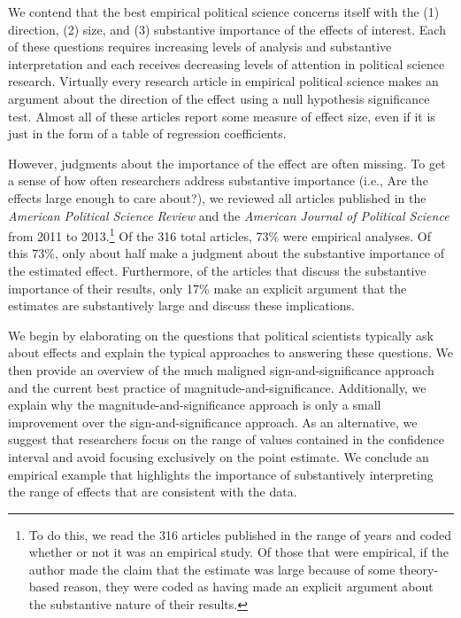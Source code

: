 \documentclass[12pt]{article}
\begin{document}
We contend that the best empirical political science concerns itself with the (1) direction, (2) size, and (3) substantive importance of the effects of interest. Each of these questions requires increasing levels of analysis and substantive interpretation and each receives decreasing levels of attention in political science research. Virtually every research article in empirical political science makes an argument about the direction of the effect using a null hypothesis significance test. Almost all of these articles report some measure of effect size, even if it is just in the form of a table of regression coefficients. 

However, judgments about the importance of the effect are often missing. To get a sense of how often researchers address substantive importance (i.e., Are the effects large enough to care about?), we reviewed all articles published in the \textit{American Political Science Review} and the \textit{American Journal of Political Science} from 2011 to 2013.\footnote{To do this, we read the 316 articles published in the range of years and coded whether or not it was an empirical study. Of those that were empirical, if the author made the claim that the estimate was large because of some theory-based reason, they were coded as having made an explicit argument about the substantive nature of their results.}  Of the 316 total articles, 73\% were empirical analyses. Of this 73\%, only about half make a judgment about the substantive importance of the estimated effect. Furthermore, of the articles that discuss the substantive importance of their results, only 17\% make an explicit argument that the estimates are substantively large and discuss these implications.

We begin by elaborating on the questions that political scientists typically ask about effects and explain the typical approaches to answering these questions. We then provide an overview of the much maligned sign-and-significance approach and the current best practice of magnitude-and-significance. Additionally, we explain why the magnitude-and-significance approach is only a small improvement over the sign-and-significance approach. As an alternative, we suggest that researchers focus on the range of values contained in the confidence interval and avoid focusing exclusively on the point estimate. We conclude an empirical example that highlights the importance of substantively interpreting the range of effects that are consistent with the data.
\end{document}

